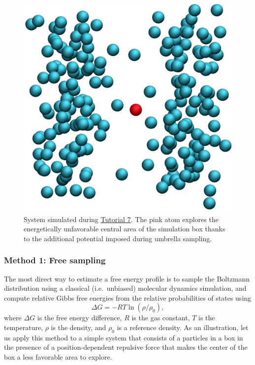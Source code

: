 \documentclass[9pt,tutorial]{livecoms}
\begin{document}
\begin{figure}
\centering
\includegraphics[width=0.7\linewidth]{US}
\caption{System simulated during \hyperref[umbrella-sampling-label]{Tutorial 7}.
The pink atom explores the energetically unfavorable central area of the simulation
box thanks to the additional potential imposed during umbrella sampling.}
\label{fig:US}
\end{figure}

\subsubsection{Method 1: Free sampling}
The most direct way to estimate a free energy profile is to sample
the Boltzmann distribution using a classical (i.e.~unbiased) molecular dynamics
simulation, and compute relative Gibbs free energies from the relative probabilities
of states using
\begin{equation}
\Delta G = -RT \ln(\rho/\rho_0),
\label{eq:G}
\end{equation}
where $\Delta G$ is the free energy difference, $R$ is the gas constant, $T$
is the temperature, %
$\rho$ is the density, and $\rho_0$ is a reference density.
As an illustration, let us apply this method to a simple system
that consists of a particles in a box in the presence of a
position-dependent repulsive force that makes the center of the box a less
favorable area to explore.
\end{document}
